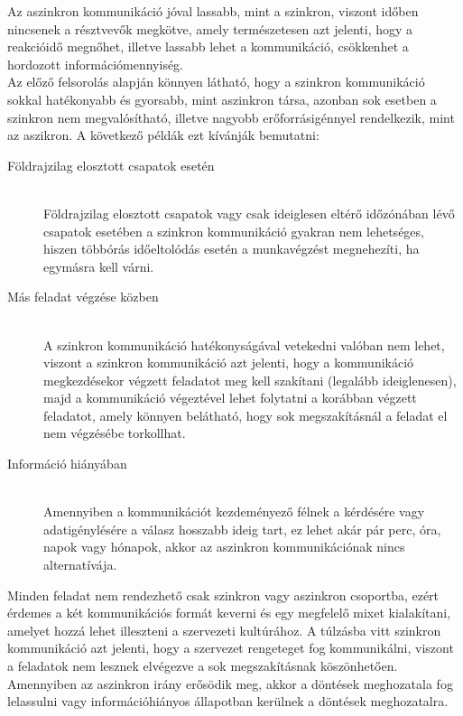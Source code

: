 Az aszinkron kommunikáció jóval lassabb, mint a szinkron, viszont időben nincsenek a résztvevők megkötve, amely természetesen azt jelenti, hogy a reakcióidő megnőhet, illetve lassabb lehet a kommunikáció, csökkenhet a hordozott információmennyiség.\\
\newline
Az előző felsorolás alapján könnyen látható, hogy a szinkron kommunikáció sokkal hatékonyabb és gyorsabb, mint aszinkron társa, azonban sok esetben a szinkron nem megvalósítható, illetve nagyobb erőforrásigénnyel rendelkezik, mint az aszikron. A következő példák ezt kívánják bemutatni:

\begin{description}
  \item [Földrajzilag elosztott csapatok esetén] \hfill\\
  Földrajzilag elosztott csapatok vagy csak ideiglesen eltérő időzónában lévő csapatok esetében a szinkron kommunikáció gyakran nem lehetséges, hiszen többórás időeltolódás esetén a munkavégzést megnehezíti, ha egymásra kell várni.
  \item [Más feladat végzése közben] \hfill\\
  A szinkron kommunikáció hatékonyságával vetekedni valóban nem lehet, viszont a szinkron kommunikáció azt jelenti, hogy a kommunikáció megkezdésekor végzett feladatot meg kell szakítani (legalább ideiglenesen), majd a kommunikáció végeztével lehet folytatni a korábban végzett feladatot, amely könnyen belátható, hogy sok megszakításnál a feladat el nem végzésébe torkollhat.
  \item [Információ hiányában] \hfill\\
  Amennyiben a kommunikációt kezdeményező félnek a kérdésére vagy adatigénylésére a válasz hosszabb ideig tart, ez lehet akár pár perc, óra, napok vagy hónapok, akkor az aszinkron kommunikációnak nincs alternatívája. 
\end{description}

Minden feladat nem rendezhető csak szinkron vagy aszinkron csoportba, ezért érdemes a két kommunikációs formát keverni és egy megfelelő mixet kialakítani, amelyet hozzá lehet illeszteni a szervezeti kultúrához. A túlzásba vitt szinkron kommunikáció azt jelenti, hogy a szervezet rengeteget fog kommunikálni, viszont a feladatok nem lesznek elvégezve a sok megszakításnak köszönhetően. Amennyiben az aszinkron irány erősödik meg, akkor a döntések meghozatala fog lelassulni vagy információhiányos állapotban kerülnek a döntések meghozatalra.

